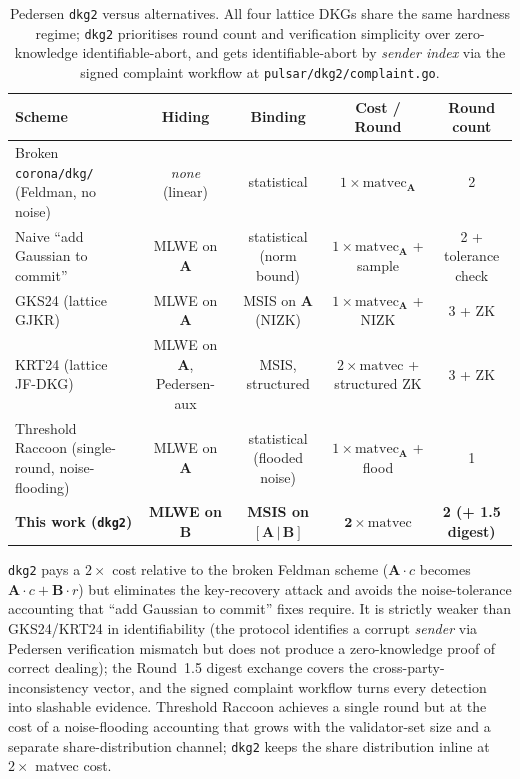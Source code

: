 \begin{table}[h]
\centering
\small
\begin{tabular}{l|c|c|c|c}
\toprule
Scheme & Hiding & Binding & Cost / Round & Round count \\
\midrule
Broken \texttt{corona/dkg/} (Feldman, no noise)
        & \emph{none} (linear)
        & statistical
        & $1\times\mathrm{matvec}_\mathbf{A}$
        & 2 \\
Naive ``add Gaussian to commit''
        & MLWE on $\mathbf{A}$
        & statistical (norm bound)
        & $1\times\mathrm{matvec}_\mathbf{A}$ + sample
        & 2 + tolerance check \\
GKS24 \cite{gks24} (lattice GJKR)
        & MLWE on $\mathbf{A}$
        & MSIS on $\mathbf{A}$ (NIZK)
        & $1\times\mathrm{matvec}_\mathbf{A}$ + NIZK
        & 3 + ZK \\
KRT24 \cite{krt24} (lattice JF-DKG)
        & MLWE on $\mathbf{A}$, Pedersen-aux
        & MSIS, structured
        & $2\times\mathrm{matvec}$ + structured ZK
        & 3 + ZK \\
Threshold Raccoon \cite{thresholdraccoon} (single-round, noise-flooding)
        & MLWE on $\mathbf{A}$
        & statistical (flooded noise)
        & $1\times\mathrm{matvec}_\mathbf{A}$ + flood
        & 1 \\
\textbf{This work (\texttt{dkg2})}
        & \textbf{MLWE on $\mathbf{B}$}
        & \textbf{MSIS on $[\mathbf{A}\,|\,\mathbf{B}]$}
        & $\mathbf{2\times\mathrm{matvec}}$
        & \textbf{2 (+ 1.5 digest)} \\
\bottomrule
\end{tabular}
\caption{Pedersen \texttt{dkg2} versus alternatives. All four lattice
DKGs share the same hardness regime; \texttt{dkg2} prioritises round
count and verification simplicity over zero-knowledge identifiable-abort,
and gets identifiable-abort by \emph{sender index} via the signed
complaint workflow at \texttt{pulsar/dkg2/complaint.go}.
\label{tab:dkg-compare}}
\end{table}

\texttt{dkg2} pays a $2\times$ cost relative to the broken Feldman
scheme ($\mathbf{A}\cdot c$ becomes $\mathbf{A}\cdot c + \mathbf{B}\cdot r$)
but eliminates the key-recovery attack and avoids the noise-tolerance
accounting that ``add Gaussian to commit'' fixes require. It is
strictly weaker than GKS24/KRT24 in identifiability (the protocol
identifies a corrupt \emph{sender} via Pedersen verification mismatch
but does not produce a zero-knowledge proof of correct dealing); the
Round~1.5 digest exchange covers the cross-party-inconsistency vector,
and the signed complaint workflow turns every detection into slashable
evidence. Threshold Raccoon \cite{thresholdraccoon} achieves a single
round but at the cost of a noise-flooding accounting that grows with
the validator-set size and a separate share-distribution channel;
\texttt{dkg2} keeps the share distribution inline at $2\times$ matvec
cost.

